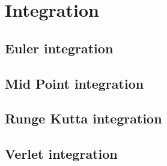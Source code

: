 \chapter{Integration} 
\section{Euler integration}

\section{Mid Point integration}

\section{Runge Kutta integration}

\section{Verlet integration}
